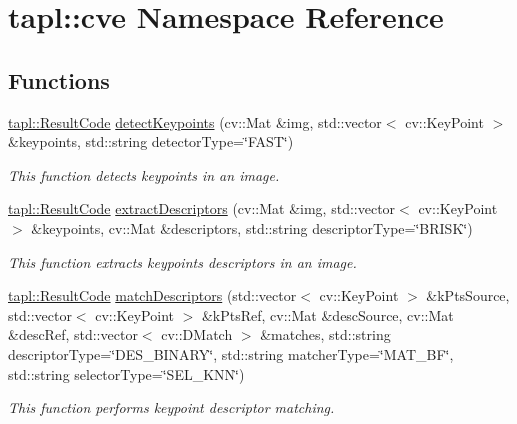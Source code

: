 \hypertarget{namespacetapl_1_1cve}{}\section{tapl\+:\+:cve Namespace Reference}
\label{namespacetapl_1_1cve}
\subsection*{Functions}
\begin{DoxyCompactItemize}
\item 
\hyperlink{namespacetapl_a196ce1d5bf399fc26f03797e6a8d03ff}{tapl\+::\+Result\+Code} \hyperlink{namespacetapl_1_1cve_ad74b56dc35c6a902870725543d5df419}{detect\+Keypoints} (cv\+::\+Mat \&img, std\+::vector$<$ cv\+::\+Key\+Point $>$ \&keypoints, std\+::string detector\+Type=\char`\"{}F\+A\+ST\char`\"{})
\begin{DoxyCompactList}\small\item\em This function detects keypoints in an image. \end{DoxyCompactList}\item 
\hyperlink{namespacetapl_a196ce1d5bf399fc26f03797e6a8d03ff}{tapl\+::\+Result\+Code} \hyperlink{namespacetapl_1_1cve_a02712316099758c2b4d0bb0e4e5dc219}{extract\+Descriptors} (cv\+::\+Mat \&img, std\+::vector$<$ cv\+::\+Key\+Point $>$ \&keypoints, cv\+::\+Mat \&descriptors, std\+::string descriptor\+Type=\char`\"{}B\+R\+I\+SK\char`\"{})
\begin{DoxyCompactList}\small\item\em This function extracts keypoints descriptors in an image. \end{DoxyCompactList}\item 
\hyperlink{namespacetapl_a196ce1d5bf399fc26f03797e6a8d03ff}{tapl\+::\+Result\+Code} \hyperlink{namespacetapl_1_1cve_ae6ed3bade2dfad9272fbe2c661d0f02e}{match\+Descriptors} (std\+::vector$<$ cv\+::\+Key\+Point $>$ \&k\+Pts\+Source, std\+::vector$<$ cv\+::\+Key\+Point $>$ \&k\+Pts\+Ref, cv\+::\+Mat \&desc\+Source, cv\+::\+Mat \&desc\+Ref, std\+::vector$<$ cv\+::\+D\+Match $>$ \&matches, std\+::string descriptor\+Type=\char`\"{}D\+E\+S\+\_\+\+B\+I\+N\+A\+RY\char`\"{}, std\+::string matcher\+Type=\char`\"{}M\+A\+T\+\_\+\+BF\char`\"{}, std\+::string selector\+Type=\char`\"{}S\+E\+L\+\_\+\+K\+NN\char`\"{})
\begin{DoxyCompactList}\small\item\em This function performs keypoint descriptor matching. \end{DoxyCompactList}\item 

\end{DoxyCompactItemize}
